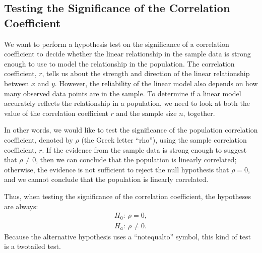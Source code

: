 \documentclass[letterpaper,10pt,english]{jupyterBook}
\begin{document}
\subsection{Testing the Significance of the Correlation Coefficient}
\label{\detokenize{Ch8 Correlation and Linear Regression/8.4 The Correlation Coefficient:testing-the-significance-of-the-correlation-coefficient}}
\sphinxAtStartPar
We want to perform a hypothesis test on the significance of a correlation coefficient to decide whether the linear relationship in the sample data is strong enough to use to model the relationship in the population. The correlation coefficient, \(r\), tells us about the strength and direction of the linear relationship between \(x\) and \(y\). However, the reliability of the linear model also depends on how many observed data points are in the sample. To determine if a linear model accurately reflects the relationship in a population, we need to look at both the value of the correlation coefficient \(r\) and the sample size \(n\), together.

\sphinxAtStartPar
In other words, we would like to test the significance of the population correlation coefficient, denoted by \(\rho\) (the Greek letter “rho”), using the sample correlation coefficient, \(r\). If the evidence from the sample data is strong enough to suggest that \(\rho \neq 0\), then we can conclude that the population is linearly correlated; otherwise, the evidence is not sufficient to reject the null hypothesis that \(\rho = 0\), and we cannot conclude that the population is linearly correlated.

\sphinxAtStartPar
Thus, when testing the significance of the correlation coefficient, the hypotheses are always:
\begin{align*}
H_0:\ \rho = 0, \\
H_a:\ \rho \neq 0.
\end{align*}
\sphinxAtStartPar
Because the alternative hypothesis uses a “not\sphinxhyphen{}equal\sphinxhyphen{}to” symbol, this kind of test is a two\sphinxhyphen{}tailed test.
\end{document}
